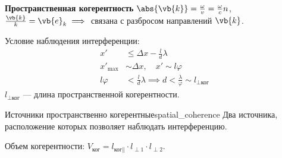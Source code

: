 \textbf{Пространственная когерентность}
$\abs{\vb{k}} = \frac{\omega}{v} = \frac{\omega}{c}n$, $\frac{\vb{k}}{k} = \vb{e}_k \implies$ связана с разбросом направлений $\vb{k}$.

\begin{figure}[H]
	\centering
\end{figure}

Условие наблюдения интерференции:
\begin{align*}
	x' &\le \Delta x - \frac{l}{d}\lambda \\
	x'_{\text{max}} &\sim \Delta x, \quad x' \sim l \varphi \\
	l \varphi &< \frac{l}{d}\lambda \implies d < \frac{\lambda}{\varphi} \sim l_{\perp \text{ког}}
\end{align*}
$l_{\perp \text{ког}}$ --- длина пространственной когерентности.

\begin{definition}{Источники пространственно когерентные}{spatial_coherence}
	Два источника, расположение которых позволяет наблюдать интерференцию.
\end{definition}

Объем когерентности: $V_{\text{ког}} = l_{\text{ког}\parallel} \cdot l_{\perp 1} \cdot l_{\perp 2}$.